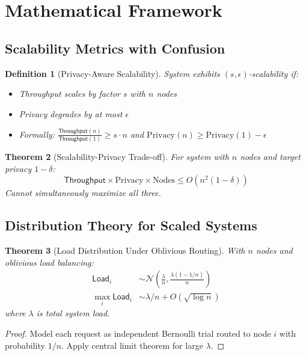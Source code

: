 \documentclass[11pt,final]{article}
\newcommand{\Load}{\mathsf{Load}}
\newcommand{\Throughput}{\mathsf{Throughput}}
\newcommand{\Normal}{\mathcal{N}}
\newtheorem{theorem}{Theorem}[section]
\newtheorem{definition}[theorem]{Definition}
\begin{document}
\section{Mathematical Framework}

\subsection{Scalability Metrics with Confusion}

\begin{definition}[Privacy-Aware Scalability]
System exhibits $(s, \epsilon)$-scalability if:
\begin{itemize}
    \item Throughput scales by factor $s$ with $n$ nodes
    \item Privacy degrades by at most $\epsilon$ 
    \item Formally: $\frac{\Throughput(n)}{\Throughput(1)} \geq s \cdot n$ and $\text{Privacy}(n) \geq \text{Privacy}(1) - \epsilon$
\end{itemize}
\end{definition}

\begin{theorem}[Scalability-Privacy Trade-off]
For system with $n$ nodes and target privacy $1-\delta$:
\begin{equation}
\Throughput \times \text{Privacy} \times \text{Nodes} \leq O(n^2(1-\delta))
\end{equation}
Cannot simultaneously maximize all three.
\end{theorem}

\subsection{Distribution Theory for Scaled Systems}

\begin{theorem}[Load Distribution Under Oblivious Routing]
With $n$ nodes and oblivious load balancing:
\begin{align}
\Load_i &\sim \Normal\left(\frac{\lambda}{n}, \frac{\lambda(1-1/n)}{n}\right) \\
\max_i \Load_i &\sim \lambda/n + O(\sqrt{\log n})
\end{align}
where $\lambda$ is total system load.
\end{theorem}

\begin{proof}
Model each request as independent Bernoulli trial routed to node $i$ with probability $1/n$. Apply central limit theorem for large $\lambda$.
\end{proof}
\end{document}
